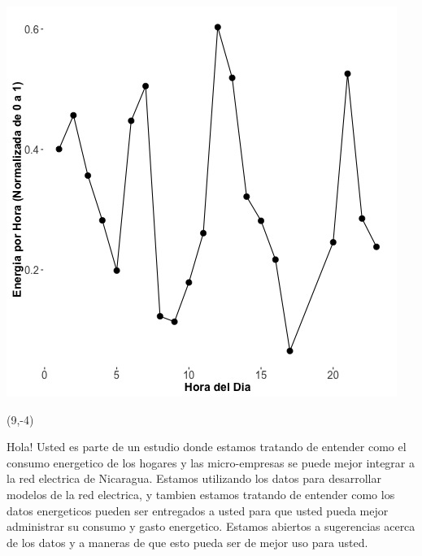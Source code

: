 \documentclass{article}\usepackage[]{graphicx}\usepackage[]{color}
\newenvironment{knitrout}{}{} %
\begin{document}
\begin{knitrout}
\color{fgcolor}
\includegraphics[scale=0.75]{figure/A17_fplot_norm_median} 
\end{knitrout}

 \begin{textblock}{1}(9,-4)
\begin{minipage}{20em}
\begingroup

\endgroup
\end{minipage}
\end{textblock}

\vspace{70px}
\begin{knitrout}
Hola! Usted es parte de un estudio donde estamos tratando de entender como el consumo energetico de los hogares y las micro-empresas se puede mejor integrar a la red electrica de Nicaragua. Estamos utilizando los datos para desarrollar modelos de la red electrica, y tambien estamos tratando de entender como los datos energeticos pueden ser entregados a usted para que usted pueda mejor administrar su consumo y gasto energetico.  Estamos abiertos a sugerencias acerca de los datos y a maneras de que esto pueda ser de mejor uso para usted.
\end{knitrout}
\end{document}

